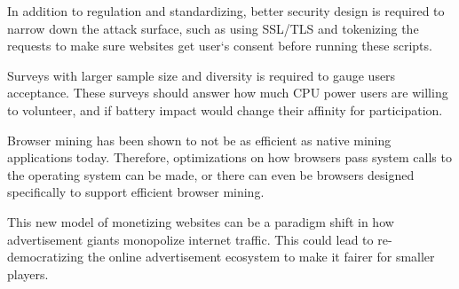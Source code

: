 In addition to regulation and standardizing, better security design is required to narrow down the attack surface, such as using SSL/TLS and tokenizing the requests to make sure websites get user`s consent before running these scripts. 

Surveys with larger sample size and diversity is required to gauge users acceptance. These surveys should answer how much CPU power users are willing to volunteer, and if battery impact would change their affinity for participation.

Browser mining has been shown to not be as efficient as native mining applications today. Therefore, optimizations on how browsers pass system calls to the operating system can be made, or there can even be browsers designed specifically to support efficient browser mining.

This new model of monetizing websites can be a paradigm shift in how advertisement giants monopolize internet traffic. This could lead to re-democratizing the online advertisement ecosystem to make it fairer for smaller players.



